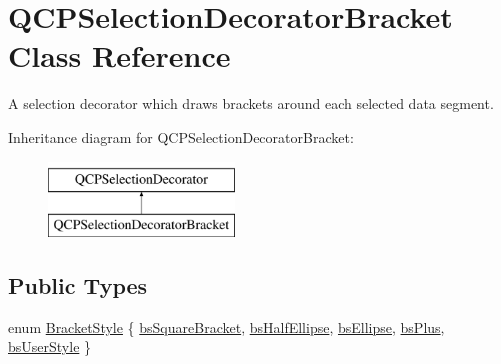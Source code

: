\hypertarget{class_q_c_p_selection_decorator_bracket}{}\section{Q\+C\+P\+Selection\+Decorator\+Bracket Class Reference}
\label{class_q_c_p_selection_decorator_bracket}


A selection decorator which draws brackets around each selected data segment.  


Inheritance diagram for Q\+C\+P\+Selection\+Decorator\+Bracket\+:\begin{figure}[H]
\begin{center}
\leavevmode
\includegraphics[height=2.000000cm]{class_q_c_p_selection_decorator_bracket}
\end{center}
\end{figure}
\subsection*{Public Types}
\begin{DoxyCompactItemize}
\item 
enum \hyperlink{class_q_c_p_selection_decorator_bracket_aa6d18517ec0553575bbef0de4252336e}{Bracket\+Style} \{ \newline
\hyperlink{class_q_c_p_selection_decorator_bracket_aa6d18517ec0553575bbef0de4252336eaa10a8d25d409b09256a13220a4d74f81}{bs\+Square\+Bracket}, 
\hyperlink{class_q_c_p_selection_decorator_bracket_aa6d18517ec0553575bbef0de4252336eafa8ad19b1822c9c03fbe5e9ff8eeeea2}{bs\+Half\+Ellipse}, 
\hyperlink{class_q_c_p_selection_decorator_bracket_aa6d18517ec0553575bbef0de4252336ea7cab0f2f406e293094a7a1e4903f6e8c}{bs\+Ellipse}, 
\hyperlink{class_q_c_p_selection_decorator_bracket_aa6d18517ec0553575bbef0de4252336ea86eb6ae27e6296576fdc46d13c840530}{bs\+Plus}, 
\newline
\hyperlink{class_q_c_p_selection_decorator_bracket_aa6d18517ec0553575bbef0de4252336ea5a627cacdaa30ce434371d6a034b991d}{bs\+User\+Style}
 \}
\end{DoxyCompactItemize}
